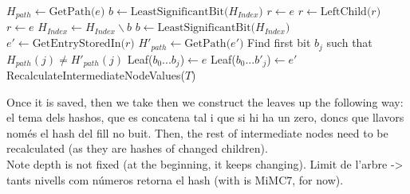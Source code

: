 \documentclass[11pt]{article}
\begin{document}
\begin{algorithm}
	\begin{algorithmic}[1]
		\State $H_{path} \gets \text{GetPath($e$)}$
		\State $b \gets \text{LeastSignificantBit($H_{Index}$)}$
		 $r \gets e$
		\Else
		 {$r \gets \text{LeftChild($r$)}$}
		\EndIf
		\State $r \gets e$
		\State $H_{Index} \gets H_{Index}\backslash{b}$
		\State $b \gets \text{LeastSignificantBit($H_{Index}$)}$
		\EndIf	
		\EndWhile
		\EndIf
		\State $e' \gets \text{GetEntryStoredIn($r$)}$
		\State $H'_{path} \gets \text{GetPath($e'$)}$
		\State Find first bit $b_j$ such that $H_{path}(j) \not= H'_{path}(j)$
		\State Leaf($b_0...b_j$)$\gets e$ %
		\State Leaf($b_0...b'_j$)$\gets e'$ %
		\State RecalculateIntermediateNodeValues($T$)	
		\EndIf
		\EndProcedure
	\end{algorithmic}
\end{algorithm}

Once it is saved, then we take then we construct the leaves up the following way: el tema dels hashos, que es concatena tal i que si hi ha un zero, doncs que llavors només el hash del fill no buit. Then, the rest of intermediate nodes need to be recalculated (as they are hashes of changed children). \\

Note depth is not fixed (at the beginning, it keeps changing). Limit de l'arbre -> tants nivells com números retorna el hash (with is MiMC7, for now). \\

\end{document}
